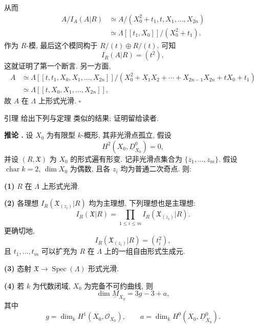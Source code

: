 
从而
\[
\begin{aligned}
A/I_A(A|R)
&\simeq A/(X_0^2+t_1,t,X_1,\ldots,X_{2n})\\
&\simeq\Lambda[[t_1,X_0]]/(X_0^2+t_1).
\end{aligned}
\]
作为 $R$-模, 最后这个模同构于 $R/(t)\oplus R/(t)$. 可知
\[
I_R(A|R)=(t^2),
\]
这就证明了第一个断言. 另一方面,
\[
\begin{aligned}
A
&\simeq
\Lambda[[t,t_1,X_0,X_1,\ldots,X_{2n}]]/
 (X_0^2+X_1X_2+\cdots+X_{2n-1}X_{2n}+tX_0+t_1)\\
&\simeq\Lambda[[t,X_0,X_1,\ldots,X_{2n}]],
\end{aligned}
\]
故 $A$ 在 $\Lambda$ 上形式光滑.
\hfill$\square$

引理  给出下列与定理  类似的结果; 证明留给读者.

\par\medskip
\noindent\textbf{推论 .}
设 $X_0$ 为有限型 $k$-概形, 其非光滑点孤立, 假设
\[
H^2(X_0,\underline D^0_{X_0})=0,
\]
并设 $(R,\mathfrak X)$ 为 $X_0$ 的形式遍有形变. 记非光滑点集合为 $\{z_1,\ldots,z_m\}$. 假设 $\operatorname{char}k=2$, $\dim X_0$ 为偶数, 且各 $z_i$ 均为普通二次奇点. 则:

\smallskip
\noindent\textbf{(1)} $R$ 在 $\Lambda$ 上形式光滑.

\smallskip
\noindent\textbf{(2)} 各理想 $I_R(\mathfrak X_{(z_i)}|R)$ 均为主理想, 下列理想也是主理想:
\[
I_R(\mathfrak X|R)
=\prod_{1\leq i\leq m}I_R(\mathfrak X_{(z_i)}|R).
\]
更确切地,
\[
I_R(\mathfrak X_{(z_i)}|R)=(t_i^2),
\]
且 $t_1,\ldots,t_m$ 可以扩充为 $R$ 在 $\Lambda$ 上的一组自由形式生成元.

\smallskip
\noindent\textbf{(3)} 态射 $\mathfrak X\longrightarrow\operatorname{Spec}(\Lambda)$ 形式光滑.

\smallskip
\noindent\textbf{(4)} 若 $k$ 为代数闭域, $X_0$ 为完备不可约曲线, 则
\[
\dim\underline M_{X_0}=3g-3+a,
\]
其中
\[
g=\dim_kH^1(X_0,\mathcal O_{X_0}),
\qquad
a=\dim_kH^0(X_0,\underline D^0_{X_0}).
\]

